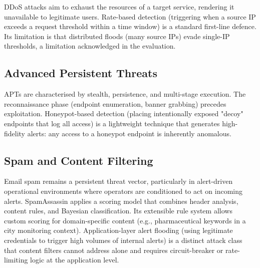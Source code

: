DDoS attacks aim to exhaust the resources of a target service, rendering it unavailable
to legitimate users. Rate-based detection (triggering when a
source IP exceeds a request threshold within a time window) is a standard first-line
defence. Its limitation is that distributed floods (many source IPs) evade single-IP
thresholds, a limitation acknowledged in the evaluation.

\subsection{Advanced Persistent Threats}

APTs are characterised by stealth, persistence, and multi-stage execution.
The reconnaissance phase (endpoint enumeration, banner grabbing) precedes exploitation.
Honeypot-based detection (placing intentionally exposed
"decoy" endpoints that log all access) is a lightweight technique that generates high-fidelity
alerts: any access to a honeypot endpoint is inherently anomalous.

\subsection{Spam and Content Filtering}

Email spam remains a persistent threat vector, particularly in alert-driven operational
environments where operators are conditioned to act on incoming alerts. SpamAssassin applies a scoring model that combines header analysis, content
rules, and Bayesian classification. Its extensible rule system allows custom scoring for
domain-specific content (e.g., pharmaceutical keywords in a city monitoring context).
Application-layer alert flooding (using legitimate credentials to trigger high volumes of
internal alerts) is a distinct attack class that content filters cannot address alone and
requires circuit-breaker or rate-limiting logic at the application level.
